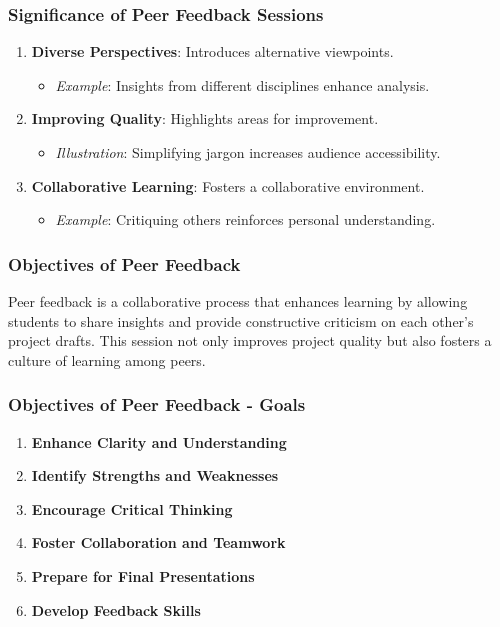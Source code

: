 \documentclass[aspectratio=169]{beamer}
\begin{document}
\begin{frame}[fragile]
    \frametitle{Significance of Peer Feedback Sessions}
    \begin{enumerate}
        \item \textbf{Diverse Perspectives}: Introduces alternative viewpoints.
            \begin{itemize}
                \item \textit{Example}: Insights from different disciplines enhance analysis.
            \end{itemize}
        \item \textbf{Improving Quality}: Highlights areas for improvement.
            \begin{itemize}
                \item \textit{Illustration}: Simplifying jargon increases audience accessibility.
            \end{itemize}
        \item \textbf{Collaborative Learning}: Fosters a collaborative environment.
            \begin{itemize}
                \item \textit{Example}: Critiquing others reinforces personal understanding.
            \end{itemize}
    \end{enumerate}
\end{frame}

\begin{frame}[fragile]
    \frametitle{Objectives of Peer Feedback}
    Peer feedback is a collaborative process that enhances learning by allowing students to share insights and provide constructive criticism on each other's project drafts. This session not only improves project quality but also fosters a culture of learning among peers.
\end{frame}

\begin{frame}[fragile]
    \frametitle{Objectives of Peer Feedback - Goals}
    \begin{enumerate}
        \item \textbf{Enhance Clarity and Understanding}
        \item \textbf{Identify Strengths and Weaknesses}
        \item \textbf{Encourage Critical Thinking}
        \item \textbf{Foster Collaboration and Teamwork}
        \item \textbf{Prepare for Final Presentations}
        \item \textbf{Develop Feedback Skills}
    \end{enumerate}
\end{frame}
\end{document}
